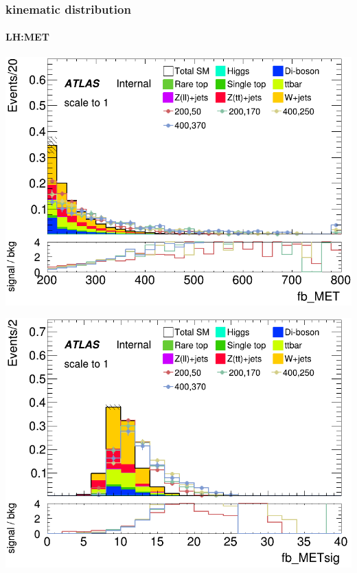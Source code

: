 \documentclass[usenames,dvipsnames]{beamer}
\begin{document}
\begin{frame}
  \frametitle{kinematic distribution}
  \framesubtitle{LH:MET}
    \begin{minipage}{0.5\textwidth}
        \centering
        \includegraphics[width=\textwidth]{graphics/LH_met_sig/LH_fb_MET_norm.png}
    \end{minipage}
    \hfill
    \begin{minipage}{0.5\textwidth}
        \centering
        \includegraphics[width=\textwidth]{graphics/LH_met_sig/LH_fb_METsig_norm.png}
    \end{minipage}
\end{frame}
\end{document}
